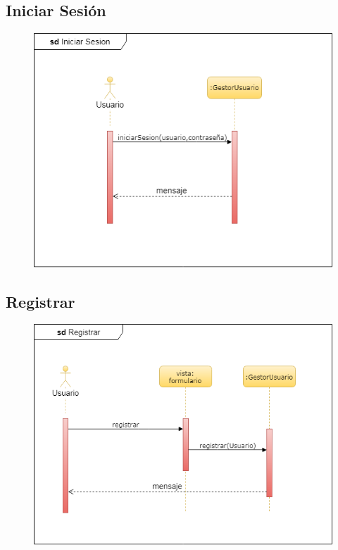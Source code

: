 		\subsection{Iniciar Sesión}
			\begin{figure}[H]
				\centering
				\includegraphics[width=1\textwidth]{imagenes/DiagramasUML/sdIniciarSesion.png}
					\label{fig:diagrama-secuencia-autenticar}
			\end{figure}

		\subsection{Registrar}
			\begin{figure}[H]
				\centering
				\includegraphics[width=1\textwidth]{imagenes/DiagramasUML/sdRegistrar.png}
					\label{fig:diagrama-secuencia-registrar}
			\end{figure}

